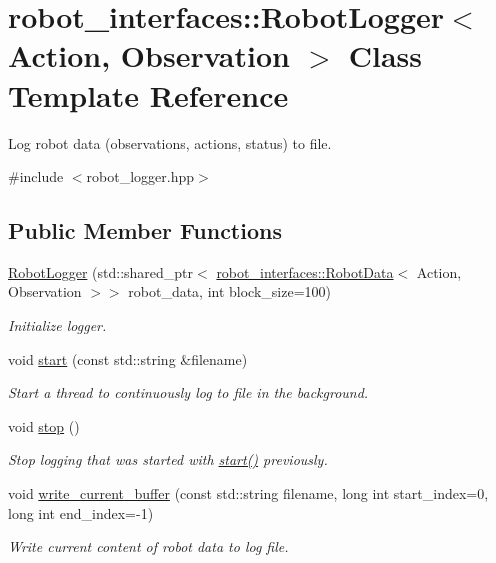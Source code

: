 \hypertarget{classrobot__interfaces_1_1RobotLogger}{}\section{robot\+\_\+interfaces\+:\+:Robot\+Logger$<$ Action, Observation $>$ Class Template Reference}
\label{classrobot__interfaces_1_1RobotLogger}


Log robot data (observations, actions, status) to file.  




{\ttfamily \#include $<$robot\+\_\+logger.\+hpp$>$}

\subsection*{Public Member Functions}
\begin{DoxyCompactItemize}
\item 
\hyperlink{classrobot__interfaces_1_1RobotLogger_aacc60628e6fd5ca26f15dfe51763697d}{Robot\+Logger} (std\+::shared\+\_\+ptr$<$ \hyperlink{classrobot__interfaces_1_1RobotData}{robot\+\_\+interfaces\+::\+Robot\+Data}$<$ Action, Observation $>$$>$ robot\+\_\+data, int block\+\_\+size=100)
\begin{DoxyCompactList}\small\item\em Initialize logger. \end{DoxyCompactList}\item 
void \hyperlink{classrobot__interfaces_1_1RobotLogger_a7a1b50c75aab3255ac7e6d412de833d1}{start} (const std\+::string \&filename)
\begin{DoxyCompactList}\small\item\em Start a thread to continuously log to file in the background. \end{DoxyCompactList}\item 
void \hyperlink{classrobot__interfaces_1_1RobotLogger_a55ec7dcacd849adee53fa49a2a0c8234}{stop} ()
\begin{DoxyCompactList}\small\item\em Stop logging that was started with {\ttfamily \hyperlink{classrobot__interfaces_1_1RobotLogger_a7a1b50c75aab3255ac7e6d412de833d1}{start()}} previously. \end{DoxyCompactList}\item 
void \hyperlink{classrobot__interfaces_1_1RobotLogger_a36b22a51e9615ee696a5baa350d3dee0}{write\+\_\+current\+\_\+buffer} (const std\+::string filename, long int start\+\_\+index=0, long int end\+\_\+index=-\/1)
\begin{DoxyCompactList}\small\item\em Write current content of robot data to log file. \end{DoxyCompactList}\end{DoxyCompactItemize}
